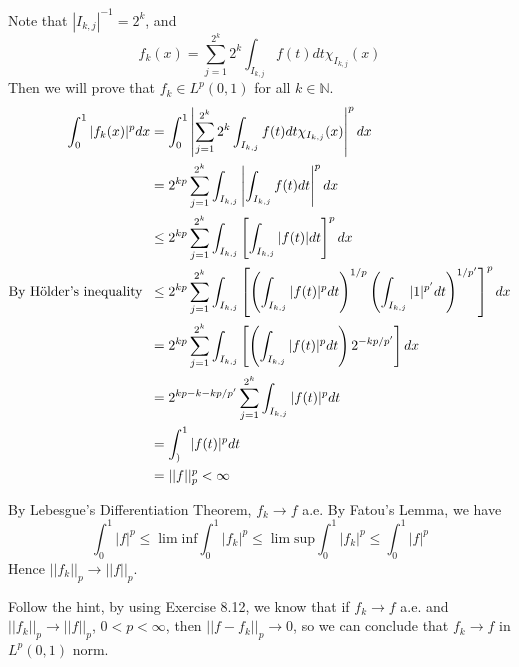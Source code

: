 \documentclass[a4paper,11pt]{article}
\begin{document}
\begin{enumerate}
		Note that $|I_{k,j}|^{-1} = 2^k$, and
			$$f_k (x) = \sum_{j=1}^{2^k} 2^k \int_{I_{k,j}} f(t) dt \chi_{I_{k,j}} (x)$$
		Then we will prove that $f_k \in L^p (0,1)$ for all $k \in \mathbb{N}$.
			$$\begin{aligned}
			\int_0^1 |f_k(x)|^p dx
			&= \int_0^1 \left| \sum_{j=1}^{2^k} 2^k \int_{I_{k,j}} f(t) dt \chi_{I_{k,j}} (x) \right|^p dx\\
			&= 2^{kp} \sum_{j=1}^{2^k} \int_{I_{k,j}} \left| \int_{I_{k,j}} f(t) dt \right|^p dx\\
			&\leq 2^{kp} \sum_{j=1}^{2^k} \int_{I_{k,j}} \left[ \int_{I_{k,j}} |f(t)| dt \right]^p dx\\
			\text{By H$\ddot{\text{o}}$lder's inequality} \hspace{0.2cm}
			&\leq 2^{kp} \sum_{j=1}^{2^k} \int_{I_{k,j}} \left[ \left( \int_{I_{k,j}} |f(t)|^p dt \right)^{1/p} \left( \int_{I_{k,j}} |1|^{p'} dt \right)^{1/p'} \right]^p dx\\
			&= 2^{kp} \sum_{j=1}^{2^k} \int_{I_{k,j}} \left[ \left( \int_{I_{k,j}} |f(t)|^p dt \right) 2^{-kp/p'} \right] dx\\
			&= 2^{kp - k - kp/p'} \sum_{j=1}^{2^k} \int_{I_{k,j}} |f(t)|^p dt\\
			&= \int_)^1 |f(t)|^p dt\\
			&= ||f||_p^p < \infty
			\end{aligned}$$

		By Lebesgue’s Differentiation Theorem, $f_k \to f$ a.e. By Fatou’s Lemma, we have
			$$\int_0^1 |f|^p
			\leq \lim \text{inf} \int_0^1 |f_k|^p
			\leq \lim \text{sup} \int_0^1 |f_k|^p
			\leq \int_0^1 |f|^p$$
		Hence $||f_k||_p \to ||f||_p$.\

		Follow the hint, by using Exercise 8.12, we know that if $f_k \to f$ a.e. and $||f_k||_p \to ||f||_p$, $0 < p < \infty$, then $||f - f_k||_p \to 0$, so we can conclude that $f_k \to f$ in $L^p(0,1)$ norm.\\



\end{enumerate}
\end{document}
